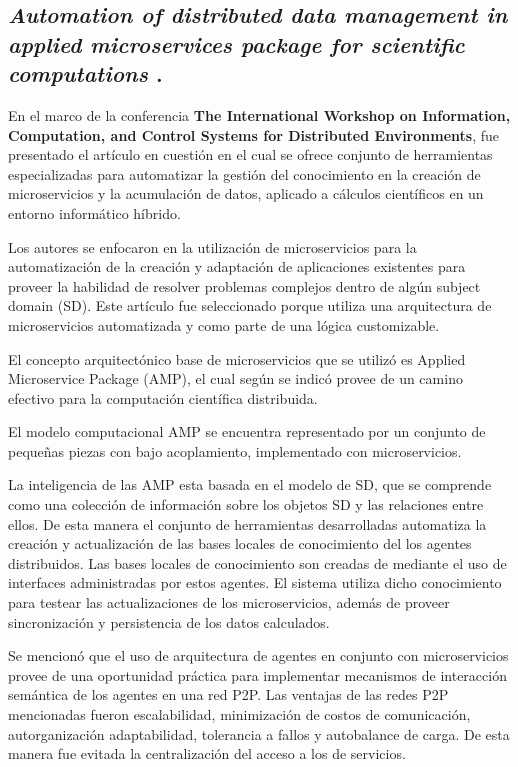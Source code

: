 \subsection{
    \textbf{\emph{Automation of distributed data management in applied
            microservices package for scientific computations
        }
    }
    \cite{oparin_automation_2020}.
}

En el marco de la conferencia
\textbf{The International Workshop on Information, Computation, and Control Systems for Distributed Environments},
fue presentado el artículo en cuestión en el cual se ofrece conjunto de herramientas especializadas para automatizar la gestión del conocimiento en
la creación de microservicios y la acumulación de datos, aplicado a
cálculos científicos en un entorno informático híbrido.\par

Los autores se enfocaron en la utilización de microservicios para la automatización de la creación y adaptación de aplicaciones existentes para proveer la habilidad de resolver problemas complejos dentro de algún subject domain (SD).
Este artículo fue seleccionado porque utiliza una arquitectura de microservicios automatizada y como parte de una
lógica customizable.\par

El concepto arquitectónico base de microservicios que se utilizó es Applied Microservice Package (AMP),
el cual según se indicó provee de un camino efectivo para la computación científica distribuida.\par

El modelo computacional AMP se encuentra representado por un conjunto de pequeñas piezas con bajo acoplamiento,
implementado con microservicios.\par

La inteligencia de las AMP esta basada en el modelo de SD,
que se comprende como una colección de información sobre los objetos SD y las relaciones entre ellos.
De esta manera el conjunto de herramientas desarrolladas automatiza la creación y actualización
de las bases locales de conocimiento del los agentes distribuidos. Las bases locales de conocimiento
son creadas de mediante el uso de interfaces administradas por estos agentes.
El sistema utiliza dicho conocimiento para testear las actualizaciones de los microservicios,
además de proveer sincronización y persistencia de los datos calculados.\par

Se mencionó que el uso de arquitectura de agentes en conjunto con microservicios provee de una oportunidad práctica
para implementar mecanismos de interacción semántica de los agentes en una red P2P.
Las ventajas de las redes P2P mencionadas fueron escalabilidad, minimización de costos de comunicación,
autorganización adaptabilidad, tolerancia a fallos y autobalance de carga.
De esta manera fue evitada la centralización del acceso a los de servicios.\par

